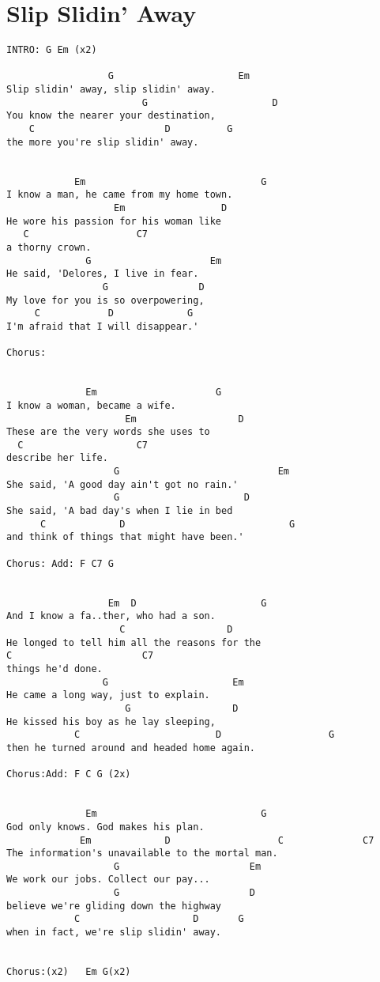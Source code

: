 \documentclass[leqno]{memoir}
\begin{document}
\chapter{Slip Slidin' Away}
\begin{verbatim}
INTRO: G Em (x2)   
  
                  G                      Em   
Slip slidin' away, slip slidin' away.   
                        G                      D   
You know the nearer your destination,   
    C                       D          G   
the more you're slip slidin' away.   

  
            Em                               G   
I know a man, he came from my home town.   
                   Em                 D   
He wore his passion for his woman like    
   C                   C7  
a thorny crown.   
              G                     Em   
He said, 'Delores, I live in fear.   
                 G                D   
My love for you is so overpowering,   
     C            D             G   
I'm afraid that I will disappear.'   

Chorus:   

  
              Em                     G   
I know a woman, became a wife.   
                     Em                  D            
These are the very words she uses to   
  C                    C7  
describe her life.   
                   G                            Em   
She said, 'A good day ain't got no rain.'   
                   G                      D   
She said, 'A bad day's when I lie in bed    
      C             D                             G   
and think of things that might have been.'   

Chorus: Add: F C7 G   

  
                  Em  D                      G   
And I know a fa..ther, who had a son.   
                    C                  D   
He longed to tell him all the reasons for the   
C                       C7  
things he'd done.   
                 G                      Em   
He came a long way, just to explain.   
                     G                  D   
He kissed his boy as he lay sleeping,   
            C                        D                   G   
then he turned around and headed home again.   

Chorus:Add: F C G (2x)  

  
              Em                             G   
God only knows. God makes his plan.   
             Em             D                   C              C7  
The information's unavailable to the mortal man.   
                   G                       Em   
We work our jobs. Collect our pay...   
                   G                       D   
believe we're gliding down the highway   
            C                    D       G   
when in fact, we're slip slidin' away.   


Chorus:(x2)   Em G(x2)   

\end{verbatim}
\newpage
\end{document}
